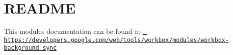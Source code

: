 \chapter{README}
\hypertarget{md_pkiclassroomrescheduler_2src_2main_2frontend_2node__modules_2workbox-background-sync_2_r_e_a_d_m_e}{}\label{md_pkiclassroomrescheduler_2src_2main_2frontend_2node__modules_2workbox-background-sync_2_r_e_a_d_m_e}
This module\textquotesingle{}s documentation can be found at \href{https://developers.google.com/web/tools/workbox/modules/workbox-background-sync}{\texttt{ https\+://developers.\+google.\+com/web/tools/workbox/modules/workbox-\/background-\/sync}} 